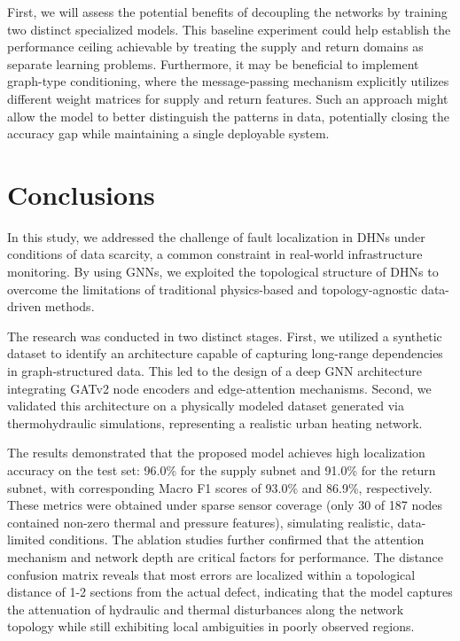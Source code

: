\documentclass[energies,article,submit,pdftex,moreauthors]{Definitions/mdpi}
\newif\ifshowrevisions
\newcommand{\revisionstyle}[1]{\textcolor{blue}{#1}}
\newcommand{\revision}[1]{\ifshowrevisions\revisionstyle{#1}\else#1\fi}
\begin{document}
First, we will assess the potential benefits of decoupling the networks by
training two distinct specialized models. This baseline experiment could help
establish the performance ceiling achievable by treating the supply and return
domains as separate learning problems. Furthermore, it may be beneficial to
implement graph-type conditioning, where the message-passing mechanism
explicitly utilizes different weight matrices for supply and return features.
Such an approach might allow the model to better distinguish the patterns in
data, potentially closing the accuracy gap while maintaining a single
deployable system.

\section{Conclusions}

In this study, we addressed the challenge of fault localization in DHNs under
conditions of data scarcity, a common constraint in real-world infrastructure
monitoring. By using GNNs, we exploited the topological structure of DHNs to
overcome the limitations of traditional physics-based and topology-agnostic
data-driven methods.

The research was conducted in two distinct stages. First, we utilized a
synthetic dataset to identify an architecture capable of capturing long-range
dependencies in graph-structured data. This led to the design of a deep GNN
architecture integrating GATv2 node encoders and edge-attention mechanisms.
Second, we validated this architecture on a physically modeled dataset
generated via thermohydraulic simulations, representing a realistic urban
heating network.

The results demonstrated that the proposed model achieves high localization
accuracy on the test set: {96.0\%} for the supply subnet and {91.0\%} for the
return subnet, with corresponding Macro F1 scores of {93.0\%} and {86.9\%},
respectively. These metrics were obtained under sparse sensor coverage (only 30
of 187 nodes contained non-zero thermal and pressure features), simulating
realistic, data-limited conditions. The ablation studies further confirmed that
the attention mechanism and network depth are critical factors for performance.
The distance confusion matrix reveals that most errors are localized within a topological distance of 1-2 sections from the actual defect, indicating that the model captures the attenuation of hydraulic and thermal disturbances along the network topology while still exhibiting local ambiguities in poorly observed regions.
\end{document}
